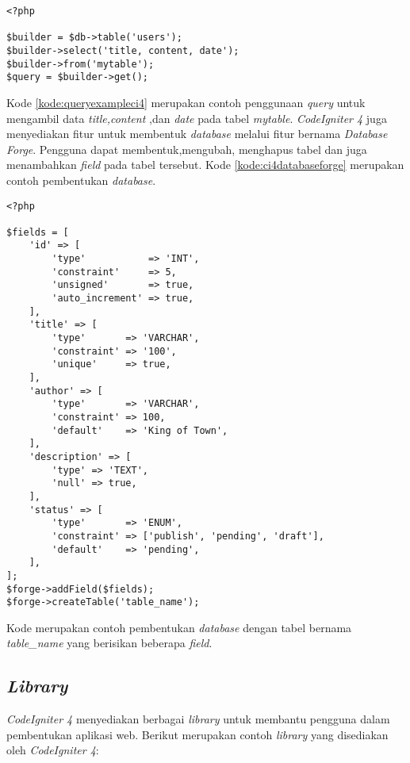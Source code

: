 \begin{lstlisting}[caption=Contoh konfigurasi \textit{database} pada \textit{CodeIgniter 4}. ,label=kode:queryexampleci4]
<?php

$builder = $db->table('users');
$builder->select('title, content, date');
$builder->from('mytable');
$query = $builder->get();
\end{lstlisting}
Kode \ref{kode:queryexampleci4} merupakan contoh penggunaan \textit{query} untuk mengambil data \textit{title,content} ,dan \textit{date} pada tabel \textit{mytable}. \textit{CodeIgniter 4} juga menyediakan fitur untuk membentuk \textit{database} melalui fitur bernama \textit{Database Forge}. Pengguna dapat membentuk,mengubah, menghapus tabel dan juga menambahkan \textit{field} pada tabel tersebut. Kode \ref{kode:ci4databaseforge} merupakan contoh pembentukan \textit{database}.
\begin{lstlisting}[caption=Contoh pembentukan tabel melalui \textit{database forge}. ,label=kode:ci4databaseforge]
<?php

$fields = [
    'id' => [
        'type'           => 'INT',
        'constraint'     => 5,
        'unsigned'       => true,
        'auto_increment' => true,
    ],
    'title' => [
        'type'       => 'VARCHAR',
        'constraint' => '100',
        'unique'     => true,
    ],
    'author' => [
        'type'       => 'VARCHAR',
        'constraint' => 100,
        'default'    => 'King of Town',
    ],
    'description' => [
        'type' => 'TEXT',
        'null' => true,
    ],
    'status' => [
        'type'       => 'ENUM',
        'constraint' => ['publish', 'pending', 'draft'],
        'default'    => 'pending',
    ],
];
$forge->addField($fields);
$forge->createTable('table_name');
\end{lstlisting}
Kode merupakan contoh pembentukan \textit{database} dengan tabel bernama \textit{table\_name} yang berisikan beberapa \textit{field}.

\subsection{\textit{Library}}
\textit{CodeIgniter 4} menyediakan berbagai \textit{library} untuk membantu pengguna dalam pembentukan aplikasi web. Berikut merupakan contoh \textit{library} yang disediakan oleh \textit{CodeIgniter 4}:

